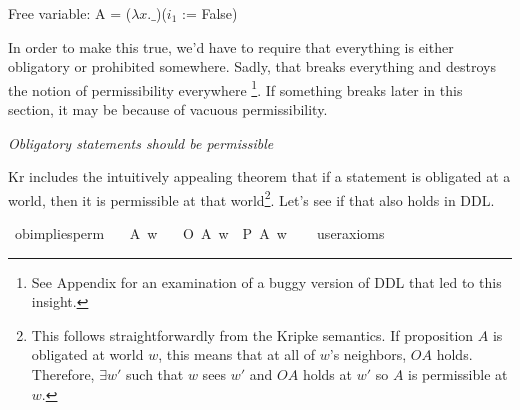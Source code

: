 \begin{isabellebody}
{  Free variable:
    A = ($\lambda x. \_$)($i_1$ := False) \color{black}%
}%
\endisatagproof
{\isafoldproof}%
%
\isadelimproof
%
\endisadelimproof
%
\begin{isamarkuptext}%
In order to make this true, we'd have to require that everything is either obligatory or
prohibited somewhere. Sadly, that breaks everything and destroys the 
notion of permissibility everywhere \footnote{See Appendix for an examination of a buggy version of DDL that led to this insight.}. 
If something breaks later in this section, it may be because of vacuous permissibility.%
\end{isamarkuptext}\isamarkuptrue%
%
\emph{Obligatory statements should be permissible}
%
\begin{isamarkuptext}%
Kr includes the intuitively appealing theorem that if a statement is obligated at a world, then it 
is permissible at that world\footnote{This follows straightforwardly from the Kripke semantics. If proposition $A$ is 
obligated at world $w$, this means that at all of $w$'s neighbors, $O A$ holds. Therefore, 
$\exists w'$ such that $w$ sees $w'$ and $O A$ holds at $w'$ so $A$ is permissible at $w$.}. Let's see 
if that also holds in DDL.%
\end{isamarkuptext}\isamarkuptrue%
\isamarkupfalse%
\ ob{\isacharunderscore}implies{\isacharunderscore}perm{\isacharcolon}\isanewline
\ \ \ A\ w\isanewline
\ \ \ {\isachardoublequoteopen}O\ {\isacharbraceleft}A{\isacharbraceright}\ w\ {\isasymlongrightarrow}\ P\ {\isacharbraceleft}A{\isacharbraceright}\ w{\isachardoublequoteclose}\isanewline
\ \ \isamarkupfalse%
\ {\isacharbrackleft}user{\isacharunderscore}axioms{\isacharbrackright}%
\isadelimproof
\ %
\endisadelimproof
%
\isatagproof
{}\isamarkupfalse%
\isanewline
%
\end{isabellebody}
